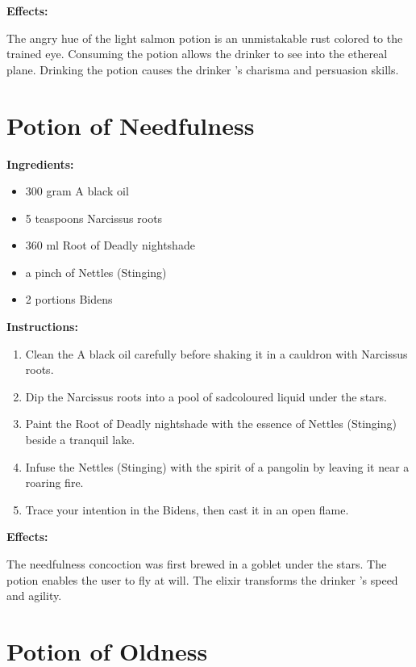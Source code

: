 \documentclass{article}
\begin{document}
\textbf{Effects:}

The angry hue of the light salmon potion is an unmistakable rust colored to the trained eye. Consuming the potion allows the drinker to see into the ethereal plane. Drinking the potion causes the drinker 's charisma and persuasion skills.

\newpage
\section*{Potion of Needfulness}

\textbf{Ingredients:}

\begin{itemize}
  \item 300 gram A black oil
  \item 5 teaspoons Narcissus roots
  \item 360 ml Root of Deadly nightshade
  \item a pinch of Nettles (Stinging)
  \item 2 portions Bidens
\end{itemize}

\textbf{Instructions:}

\begin{enumerate}
  \item Clean the A black oil carefully before shaking it in a cauldron with Narcissus roots.
  \item Dip the Narcissus roots into a pool of sadcoloured liquid under the stars.
  \item Paint the Root of Deadly nightshade with the essence of Nettles (Stinging) beside a tranquil lake.
  \item Infuse the Nettles (Stinging) with the spirit of a pangolin by leaving it near a roaring fire.
  \item Trace your intention in the Bidens, then cast it in an open flame.
\end{enumerate}

\textbf{Effects:}

The needfulness concoction was first brewed in a goblet under the stars. The potion enables the user to fly at will. The elixir transforms the drinker 's speed and agility.

\newpage
\section*{Potion of Oldness}
\end{document}
